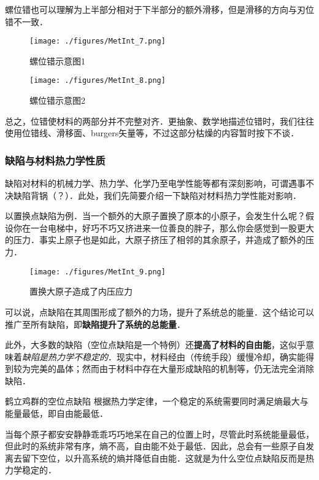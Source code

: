 螺位错也可以理解为上半部分相对于下半部分的额外滑移，但是滑移的方向与刃位错不一致．
\begin{figure}[ht]
\centering
\texttt{[image: ./figures/MetInt\_7.png]}
\caption{螺位错示意图1} \label{MetInt_fig7}
\end{figure}
\begin{figure}[ht]
\centering
\texttt{[image: ./figures/MetInt\_8.png]}
\caption{螺位错示意图2} \label{MetInt_fig8}
\end{figure}

总之，位错使材料的两部分并不完整对齐．更抽象、数学地描述位错时，我们往往使用位错线、滑移面、burgers矢量等，不过这部分枯燥的内容暂时按下不谈．


\subsubsection{缺陷与材料热力学性质}
缺陷对材料的机械力学、热力学、化学乃至电学性能等都有深刻影响，可谓遇事不决缺陷背锅（？）．此处，我们先简要介绍一下缺陷对材料热力学性能对影响．

以置换点缺陷为例．当一个额外的大原子置换了原本的小原子，会发生什么呢？假设你在一台电梯中，好巧不巧又挤进来一位善良的胖子，那么你会感觉到一股更大的压力．事实上原子也是如此，大原子挤压了相邻的其余原子，并造成了额外的压力．
\begin{figure}[ht]
\centering
\texttt{[image: ./figures/MetInt\_9.png]}
\caption{置换大原子造成了内压应力} \label{MetInt_fig9}
\end{figure}
可以说，点缺陷在其周围形成了额外的力场，提升了系统总的能量．这个结论可以推广至所有缺陷，即\textbf{缺陷提升了系统的总能量}．

此外，大多数的缺陷（空位点缺陷是一个特例）还\textbf{提高了材料的自由能}，这似乎意味着\textsl{缺陷是热力学不稳定的}．现实中，材料经由（传统手段）缓慢冷却，确实能得到较为完美的晶体；然而由于材料中存在大量形成缺陷的机制等，仍无法完全消除缺陷．

\begin{example}{鹤立鸡群的空位点缺陷}
根据热力学定律，一个稳定的系统需要同时满足熵最大与能量最低，即自由能最低．

当每个原子都安安静静乖乖巧巧地呆在自己的位置上时，尽管此时系统能量最低，但此时的系统非常有序，熵不高，自由能不处于最低．因此，总会有一些原子自发离去留下空位，以升高系统的熵并降低自由能．这就是为什么空位点缺陷反而是热力学稳定的．
\end{example}

